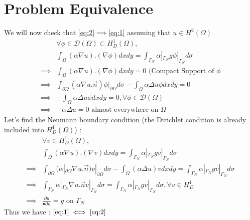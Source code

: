 \documentclass[a4paper]{report}
\begin{document}
\section{Problem Equivalence}
We will now check that \ref{eq:2}$\implies$\ref{eq:1} assuming that $u \in H^2(\Omega)$\\
\begin{align*}
&\forall \phi \in \mathcal{D}(\Omega)\subset H^1_D(\Omega),\\
&\int_\Omega (\alpha \nabla u).(\nabla \phi) dxdy=\int_{\Gamma_N} \alpha |_{\Gamma_N}g \phi |_{\Gamma_N} d\sigma\\
\implies & \int_\Omega (\alpha \nabla u).(\nabla \phi) dxdy=0\text{ (Compact Support of $\phi$}\\
\implies & \int_{\partial \Omega} (\alpha \nabla u . \overrightarrow{n})\phi |_{\partial \Omega} d\sigma - \int_\Omega \alpha \Delta u \phi dxdy=0\\
\implies &- \int_\Omega \alpha \Delta u \phi dxdy=0, \forall \phi \in \mathcal{D}(\Omega)\\
\implies & - \alpha \Delta u =0 \text{ almost everywhere on } \Omega
\end{align*}
Let's find the Neumann boundary condition (the Dirichlet condition is already included into $H^1_D(\Omega)$) :
\begin{align*}
&\forall v \in H^1_D(\Omega),\\
&\int_\Omega (\alpha \nabla u).(\nabla v) dxdy=\int_{\Gamma_N}\alpha |_{\Gamma_N}g v |_{\Gamma_N} d\sigma\\
\implies & \int_{\partial \Omega} (\alpha|_{\partial \Omega} \nabla u .\overrightarrow{n}) v|_{\partial \Omega} d\sigma - \int_\Omega (\alpha \Delta u ) v dxdy = \int_{\Gamma_N}\alpha|_{\Gamma_N}g v |_{\Gamma_N} d\sigma\\
\implies & \int_{\Gamma_N} \alpha|_{\Gamma_N} \nabla u .\overrightarrow{n}v|_{\Gamma_N} d\sigma = \int_{\Gamma_N}\alpha |_{\Gamma_N}g v |_{\Gamma_N} d\sigma, \forall v \in H^1_D \\
\implies & \frac{\partial u}{•\partial n}=g \text{ on } \Gamma_N
\end{align*}
Thus we have : $\ref{eq:1} \iff \ref{eq:2}$
\end{document}
